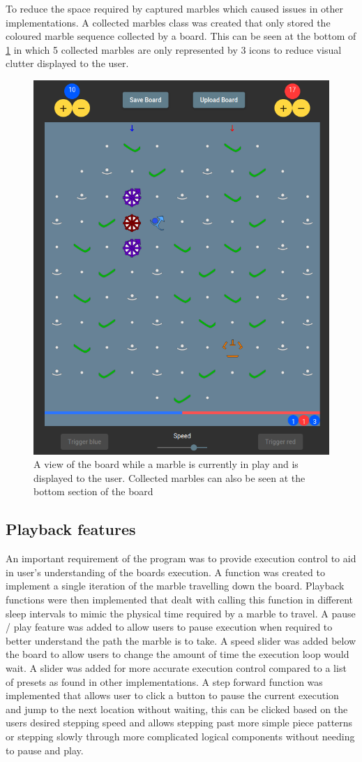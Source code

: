 \documentclass{l4proj}
\begin{document}
To reduce the space required by captured marbles which caused issues in other implementations. A collected marbles class was created that only stored the coloured marble sequence collected by a board. This can be seen at the bottom of \ref{fig:marbleInPlay} in which 5 collected marbles are only represented by 3 icons to reduce visual clutter displayed to the user.
   
\begin{figure}
    \centering
    \includegraphics[width=0.5\linewidth]{images/marbleInPlay.png}
    \caption{A view of the board while a marble is currently in play and is displayed to the user. Collected marbles can also be seen at the bottom section of the board}
    \label{fig:marbleInPlay}
\end{figure}

\subsection{Playback features}
An important requirement of the program was to provide execution control to aid in user's understanding of the boards execution. A function was created to implement a single iteration of the marble travelling down the board. Playback functions were then implemented that dealt with calling this function in different sleep intervals to mimic the physical time required by a marble to travel. A pause / play feature was added to allow users to pause execution when required to better understand the path the marble is to take. A speed slider was added below the board to allow users to change the amount of time the execution loop would wait. A slider was added for more accurate execution control compared to a list of presets as found in other implementations. A step forward function was implemented that allows user to click a button to pause the current execution and jump to the next location without waiting, this can be clicked based on the users desired stepping speed and allows stepping past more simple piece patterns or stepping slowly through more complicated logical components without needing to pause and play. 
\end{document}
